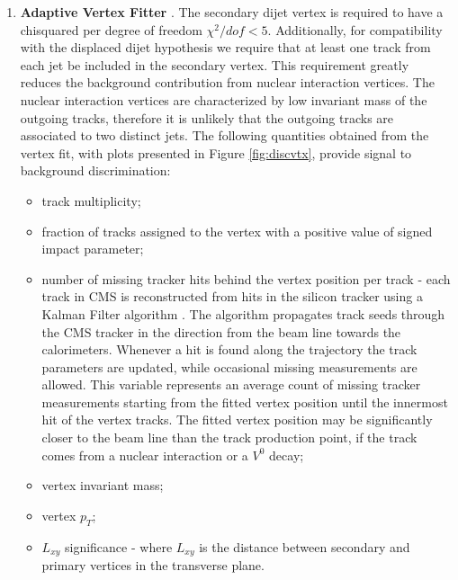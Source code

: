\begin{enumerate}

\item{\bf Adaptive Vertex Fitter}
\label{subsec:AVF}
\cite{Frühwirth:1027031}. The secondary dijet vertex is required to have a chisquared per degree of freedom 
$\chi^2/dof < 5$. Additionally, for compatibility with the displaced dijet hypothesis we require that at least 
one track from each jet be included in the secondary vertex. 
This requirement greatly reduces the background contribution
from nuclear interaction vertices. The nuclear interaction vertices are characterized by low invariant mass
of the outgoing tracks, therefore it is unlikely that the outgoing tracks are associated to two distinct jets. 
The following quantities obtained from the vertex fit, with plots presented in Figure
\ref{fig:discvtx}, provide signal to background discrimination:
\begin{itemize}
 \item track multiplicity;
 \item fraction of tracks assigned to the vertex with a positive value of signed impact parameter;
 \item number of missing tracker hits behind the vertex position per track - each track in CMS is reconstructed 
from hits in the silicon tracker using a Kalman Filter algorithm \cite{CMS_IN_2007-065}. The algorithm propagates
 track seeds through the CMS tracker in the direction from the beam line towards the calorimeters. Whenever a hit 
is found along the trajectory the track parameters are updated, while occasional missing measurements 
are allowed. 
This variable represents an average count of missing tracker measurements 
starting from the fitted vertex position until the innermost hit of the vertex tracks. The fitted vertex position
may be significantly closer to the beam line than the track production point, if the track comes from a nuclear
 interaction or a $V^0$ decay;
 \item vertex invariant mass;
 \item vertex $p_T$;
 \item $L_{xy}$ significance - where $L_{xy}$ is the distance between secondary and primary vertices
in the transverse plane.
\end{itemize}



\end{enumerate}

